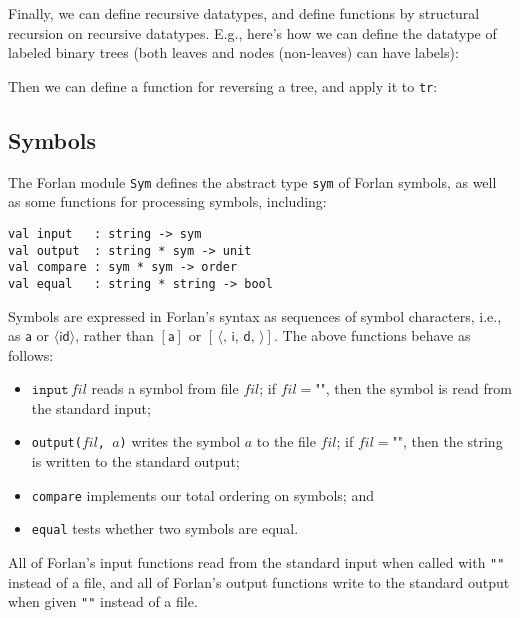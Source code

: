 %
%
Finally, we can define recursive datatypes, and define functions
by structural recursion on recursive datatypes. E.g., here's how
we can define the datatype of labeled binary trees (both leaves and
nodes (non-leaves) can have labels):

Then we can define a function for reversing a tree, and apply it to
\texttt{tr}:

%

\subsection{Symbols}

The Forlan module \texttt{Sym}
%
defines the abstract type \texttt{sym}
%
%
of Forlan symbols,
%
as well as some functions for processing symbols, including:
\begin{verbatim}
val input   : string -> sym
val output  : string * sym -> unit
val compare : sym * sym -> order
val equal   : string * string -> bool
\end{verbatim}
%
%
%
Symbols are expressed in Forlan's syntax as sequences of symbol
characters, i.e., as $\mathsf{a}$ or $\langle\mathsf{id}\rangle$,
rather than $[\mathsf{a}]$ or $\mathsf{[\,\langle,\,i,\,d,\,\rangle]}$.
The above functions behave as follows:
\begin{itemize}
\item $\mathtt{input}\,\mathit{fil}$ reads a symbol from file
$\mathit{fil}$; if $\mathit{fil} = \texttt{""}$, then the symbol is
read from the standard input;

\item \texttt{output($\mathit{fil}$,\,$a$)} writes the symbol $a$ to
the file $\mathit{fil}$; if $\mathit{fil} = \texttt{""}$, then the
string is written to the standard output;

\item \texttt{compare} implements our total ordering on symbols; and

\item \texttt{equal} tests whether two symbols are equal.
\end{itemize}
All of Forlan's input functions read from the standard input
when called with \texttt{""} instead of a file, and all of Forlan's
output functions write to the standard output when given
\texttt{""} instead of a file.

